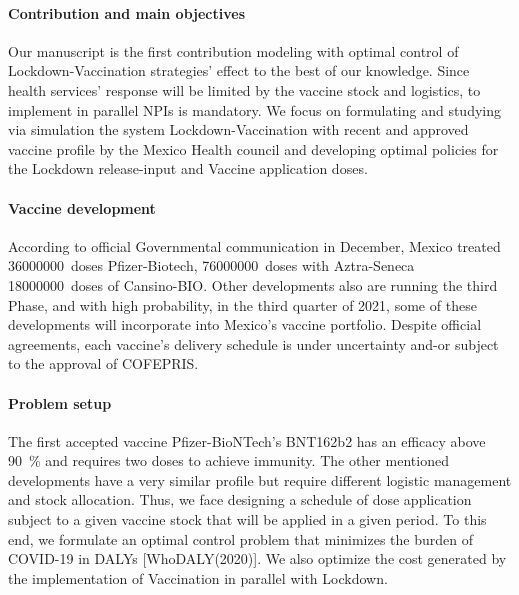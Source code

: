 \paragraph{Contribution and main objectives}
        Our manuscript is the first contribution modeling with optimal control 
    of Lockdown-Vaccination strategies' effect to the best of our knowledge. 
    Since health services' response will be limited by the vaccine stock
    and logistics, to implement in parallel NPIs is mandatory. We focus on 
    formulating and studying via simulation the system Lockdown-Vaccination 
    with recent and approved vaccine profile by the  Mexico Health council and 
    developing optimal policies for the Lockdown release-input and Vaccine 
    application doses.
\paragraph{Vaccine development}
        According to official Governmental communication in December, Mexico 
    treated  \SI{36000000}{doses} Pfizer-Biotech, \SI{76000000}{doses} with 
    Aztra-Seneca \SI{18000000}{doses} of Cansino-BIO. Other developments 
    also are running the  third Phase, and with high probability,  in the 
    third quarter of 2021, some of these developments will incorporate into 
    Mexico's vaccine portfolio. Despite official agreements, each vaccine's 
    delivery schedule is under uncertainty and-or subject to the approval 
    of COFEPRIS.
\paragraph{Problem setup}
        The first accepted vaccine \textemdash Pfizer-BioNTech's BNT162b2 
    \textemdash has an efficacy above \SI{90}{\percent}  and requires 
    two doses to achieve immunity. The other mentioned developments have a very 
    similar profile but require different logistic management and stock 
    allocation.  Thus, we face designing a schedule of dose application subject 
    to a given vaccine stock that will be applied in a given period. To this 
    end, we formulate an optimal control problem that minimizes the burden of 
    COVID-19 in DALYs [WhoDALY(2020)]. We also optimize the cost generated by 
    the implementation of Vaccination in parallel with Lockdown.

